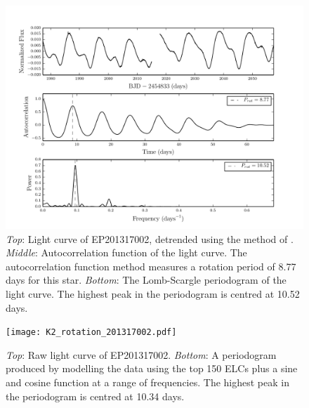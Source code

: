\documentclass[useAMS, usenatbib]{aastex}
\begin{document}
\begin{figure}
\begin{center}
\includegraphics[width=6in, clip=true]{rotation_poster_child.pdf}
\caption{{\it Top}: Light curve of EP201317002, detrended using the method
of \citet{Vanderburg2014}. {\it Middle}: Autocorrelation function of the
light curve. The autocorrelation function method measures a rotation period of
8.77 days for this star. {\it Bottom}: The Lomb-Scargle periodogram of the
light curve. The highest peak in the periodogram is centred at 10.52 days.}
\label{fig:rotation_poster_child}
\end{center}
\end{figure}

\begin{figure}
\begin{center}
\texttt{[image: K2\_rotation\_201317002.pdf]}
\caption{{\it Top}: Raw light curve of EP201317002. {\it Bottom}: A
periodogram produced by modelling the data using the top 150 ELCs
plus a sine and cosine function at a range of frequencies. The highest peak in
the periodogram is centred at 10.34 days.}
\label{fig:K2_rotation_poster_child}
\end{center}
\end{figure}
\end{document}
